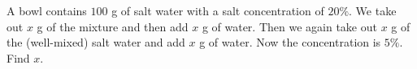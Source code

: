 A bowl contains $100$ g of salt water with a salt concentration of $20\%$. We take out $x$ g of the mixture and then add $x$ g of water. Then we again take out $x$ g of the (well-mixed) salt water and add $x$ g of water. Now the concentration is $5\%$. Find $x$.
